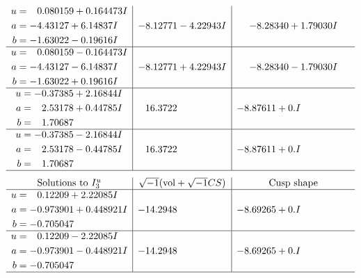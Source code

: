 \documentclass[1p]{elsarticle_modified}
\theoremstyle{definition}
\newcommand{\I}{\sqrt{-1}}
\begin{document}
$$\begin{array}{c|c|c}
\begin{aligned}
u &= \phantom{-}0.080159 + 0.164473 I \\
a &= -4.43127 + 6.14837 I \\
b &= -1.63022 - 0.19616 I\end{aligned}
 & -8.12771 - 4.22943 I & -8.28340 + 1.79030 I \\ \hline\begin{aligned}
u &= \phantom{-}0.080159 - 0.164473 I \\
a &= -4.43127 - 6.14837 I \\
b &= -1.63022 + 0.19616 I\end{aligned}
 & -8.12771 + 4.22943 I & -8.28340 - 1.79030 I \\ \hline\begin{aligned}
u &= -0.37385 + 2.16844 I \\
a &= \phantom{-}2.53178 + 0.44785 I \\
b &= \phantom{-}1.70687\phantom{ +0.000000I}\end{aligned}
 & \phantom{-}16.3722\phantom{ +0.000000I} & -8.87611 + 0. I\phantom{ +0.000000I} \\ \hline\begin{aligned}
u &= -0.37385 - 2.16844 I \\
a &= \phantom{-}2.53178 - 0.44785 I \\
b &= \phantom{-}1.70687\phantom{ +0.000000I}\end{aligned}
 & \phantom{-}16.3722\phantom{ +0.000000I} & -8.87611 + 0. I\phantom{ +0.000000I}\\
 \hline 
 \end{array}$$\newpage$$\begin{array}{c|c|c}  
\text{Solutions to }I^u_{3}& \I (\text{vol} + \sqrt{-1}CS) & \text{Cusp shape}\\
 \hline 
\begin{aligned}
u &= \phantom{-}0.12209 + 2.22085 I \\
a &= -0.973901 + 0.448921 I \\
b &= -0.705047\phantom{ +0.000000I}\end{aligned}
 & -14.2948\phantom{ +0.000000I} & -8.69265 + 0. I\phantom{ +0.000000I} \\ \hline\begin{aligned}
u &= \phantom{-}0.12209 - 2.22085 I \\
a &= -0.973901 - 0.448921 I \\
b &= -0.705047\phantom{ +0.000000I}\end{aligned}
 & -14.2948\phantom{ +0.000000I} & -8.69265 + 0. I\phantom{ +0.000000I}\\
 \hline 
 \end{array}$$\newpage\newpage\renewcommand{\arraystretch}{1}
\end{document}
